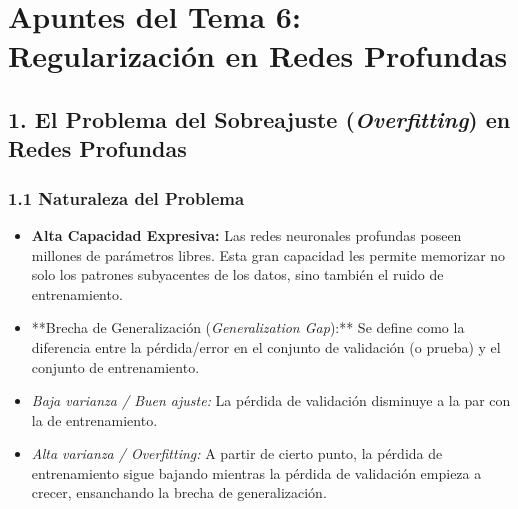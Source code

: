 \documentclass[11pt,oneside]{article}
\begin{document}
\tableofcontents
\clearpage
{}
\section{Apuntes del Tema 6: Regularización en Redes Profundas}

\subsection{1. El Problema del Sobreajuste (\emph{Overfitting}) en Redes Profundas}

\subsubsection{1.1 Naturaleza del Problema}

\begin{itemize}

\item \textbf{Alta Capacidad Expresiva:} Las redes neuronales profundas poseen millones de parámetros libres. Esta gran capacidad les permite memorizar no solo los patrones subyacentes de los datos, sino también el ruido de entrenamiento.

\end{itemize}

\begin{itemize}

\item **Brecha de Generalización (\emph{Generalization Gap}):** Se define como la diferencia entre la pérdida/error en el conjunto de validación (o prueba) y el conjunto de entrenamiento.

\end{itemize}

\begin{itemize}

\item \emph{Baja varianza / Buen ajuste:} La pérdida de validación disminuye a la par con la de entrenamiento.

\end{itemize}

\begin{itemize}

\item \emph{Alta varianza / Overfitting:} A partir de cierto punto, la pérdida de entrenamiento sigue bajando mientras la pérdida de validación empieza a crecer, ensanchando la brecha de generalización.

\end{itemize}
\end{document}
